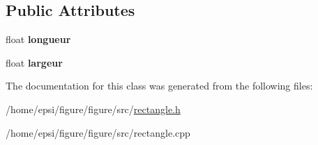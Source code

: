 \subsection*{Public Attributes}
\begin{DoxyCompactItemize}
\item 
\mbox{\label{classrectangle_a323614223c090cf3701e0877ff552328}} 
float {\bfseries longueur}
\item 
\mbox{\label{classrectangle_afcdec92029cdbf85d33d8e11f389b37e}} 
float {\bfseries largeur}
\end{DoxyCompactItemize}


The documentation for this class was generated from the following files\+:\begin{DoxyCompactItemize}
\item 
/home/epsi/figure/figure/src/\hyperlink{rectangle_8h}{rectangle.\+h}\item 
/home/epsi/figure/figure/src/rectangle.\+cpp\end{DoxyCompactItemize}
